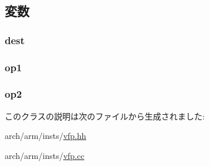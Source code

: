 \subsection{変数}
\hypertarget{classArmISA_1_1FpRegRegRegOp_aec72e8e45bdc87abeeeb75d2a8a9a716}{
\subsubsection[{dest}]{ {\bf dest}}}
\label{classArmISA_1_1FpRegRegRegOp_aec72e8e45bdc87abeeeb75d2a8a9a716}
\hypertarget{classArmISA_1_1FpRegRegRegOp_a4c465c43ad568f8bcf8ae71480e9cfea}{
\subsubsection[{op1}]{ {\bf op1}}}
\label{classArmISA_1_1FpRegRegRegOp_a4c465c43ad568f8bcf8ae71480e9cfea}
\hypertarget{classArmISA_1_1FpRegRegRegOp_a7799ff6cbe5a252199059eb8665820e7}{
\subsubsection[{op2}]{ {\bf op2}}}
\label{classArmISA_1_1FpRegRegRegOp_a7799ff6cbe5a252199059eb8665820e7}


このクラスの説明は次のファイルから生成されました:\begin{DoxyCompactItemize}
\item 
arch/arm/insts/\hyperlink{vfp_8hh}{vfp.hh}\item 
arch/arm/insts/\hyperlink{vfp_8cc}{vfp.cc}\end{DoxyCompactItemize}
